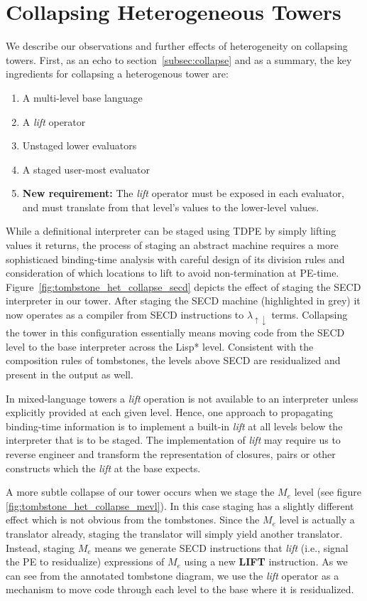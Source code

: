 \documentclass[sigplan,anonymous,review]{acmart}
\newcommand{\mslang}{$\lambda_{\uparrow\downarrow}$}
\newcommand{\mevl}{$M_{e}$}
\theoremstyle{definition}
\begin{document}
\section{Collapsing Heterogeneous Towers}\label{subsec:collapseh}
We describe our observations and further effects of heterogeneity on collapsing towers.
First, as an echo to section~\ref{subsec:collapse} and as a summary, the key ingredients for collapsing a heterogenous tower are:
\begin{enumerate}
    \item A multi-level base language
    \item A \textit{lift} operator
    \item Unstaged lower evaluators
    \item A staged user-most evaluator
    \item \textbf{New requirement: } The \textit{lift} operator must be exposed in each evaluator, and must translate from that level's values to the lower-level values.
\end{enumerate}

While a definitional interpreter can be staged using TDPE by simply lifting values it returns, the process of staging an abstract machine requires a more sophisticaed binding-time analysis with careful design of its division rules
and consideration of which locations to lift to avoid non-termination at PE-time. Figure~\ref{fig:tombstone_het_collapse_secd} depicts the effect of staging the SECD interpreter in our tower. After staging the SECD machine (highlighted in grey) it now operates as a compiler from SECD instructions to \mslang{} terms. Collapsing the tower in this configuration essentially means moving code from the SECD level to the base interpreter across the Lisp* level. Consistent with the composition rules of tombstones, the levels above SECD are residualized and present in the output as well.

In mixed-language towers a \textit{lift} operation is not available to an interpreter unless explicitly provided at each given level.
Hence, one approach to propagating binding-time information is to implement a built-in \textit{lift} at all levels below the interpreter that is to be staged. The implementation of \textit{lift} may require us to reverse engineer and transform the representation of closures, pairs or other constructs which the \textit{lift} at the base expects.

A more subtle collapse of our tower occurs when we stage the \mevl{} level (see figure \ref{fig:tombstone_het_collapse_mevl}). In this case staging has a slightly different effect which is not obvious from the tombstones. Since the \mevl{} level is actually a translator already, staging the translator will simply yield another translator. Instead, staging \mevl{} means we generate SECD instructions that \textit{lift} (i.e., signal the PE to residualize) expressions of \mevl{} using a new \textbf{LIFT} instruction. As we can see from the annotated tombstone diagram, we use the \textit{lift} operator as a mechanism to move code through each level to the base where it is residualized.
\end{document}
